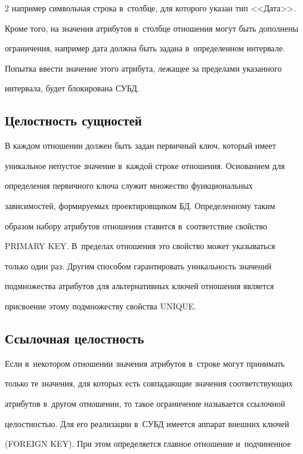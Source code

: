 \begin{multicols}{2}
например символьная строка в~столбце, для которого указан тип <<Дата>>.

Кроме того, на значения атрибутов в~столбце отношения могут быть дополнены

ограничения, например дата должна быть задана в~определенном интервале.

Попытка ввес\-ти значение этого атрибута, лежащее за пределами указанного

интервала, будет блокирована СУБД.



\subsection{Целостность сущностей}



  В каждом отношении должен быть задан первичный ключ, который имеет

уникальное непустое значение в~каждой строке отношения. Основанием для

определения первичного ключа служит множество функциональных

зависимостей, формиру\-емых проектировщиком БД. Определенному таким

образом набору атрибутов отношения ставится в~соответствие свойство

PRIMARY KEY. В~пределах отношения это свойство может указываться

только один раз. Другим способом гарантировать уникальность значений

подмножества атрибутов для альтернативных ключей отношения является

присвоение этому подмножеству свойства UNIQUE.



\subsection{Ссылочная целостность}



  Если в~некотором отношении значения атрибутов в~строке могут принимать

только те значения, для которых есть совпадающие значения соответствующих

атрибутов в~другом отношении, то такое ограничение называется ссылочной

це\-лост\-ностью. Для его реализации в~СУБД имеется аппарат внешних ключей

(FOREIGN KEY). При этом определяется главное отношение и~подчиненное


\end{multicols}
